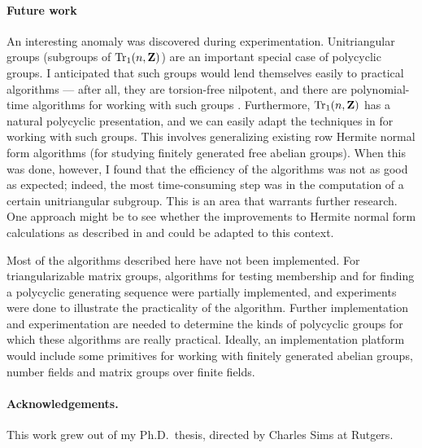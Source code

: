 \paragraph{Future work}
An interesting anomaly was discovered during experimentation.
Unitriangular groups (subgroups of $\mbox{Tr}_1(n,{\bf Z})$) are 
an important special case of polycyclic groups.
I anticipated that such groups would lend themselves easily
to practical algorithms --- after all, they are torsion-free
nilpotent, and there are polynomial-time algorithms for working with
such groups \cite{Beals:nilfin}.
Furthermore, $\mbox{Tr}_1(n,{\bf Z})$ has a natural polycyclic presentation,
and we can easily adapt the techniques in \cite{Sims}
for working with such groups.
This involves generalizing existing row Hermite normal
form algorithms (for
studying finitely generated free abelian groups).
When this was done,
however, I found that the efficiency of the algorithms
was not as good as expected;
indeed, the most time-consuming step
was in the computation of a certain unitriangular
subgroup.
This is an area that warrants further research.
One approach might be to see whether the improvements
to Hermite normal form calculations as described in \cite{Havas1}
and \cite{Havas2}
could be adapted to this context.

Most of the algorithms described here have not been implemented.
For triangularizable matrix groups, algorithms for testing 
membership and for finding a polycyclic generating sequence
were partially implemented, and experiments were done to 
illustrate the practicality of the algorithm.  Further implementation
and experimentation are needed to determine the kinds of
polycyclic groups 
for which these algorithms are really practical.
Ideally, an implementation platform would include 
some primitives for working with finitely generated abelian 
groups, number fields and matrix groups over finite
fields.

\paragraph{Acknowledgements.}  This work grew out of my
Ph.D.\ thesis, directed by Charles Sims at Rutgers.






